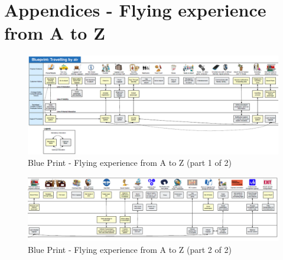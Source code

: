 \chapter{Appendices - Flying experience from A to Z}


\begin{figure}[h!]
	\centering
		\includegraphics[width=1.15\textwidth]{Figures/Appendix1/blueprint1}
		\caption[test meetings data]{Blue Print - Flying experience from A to Z (part 1 of 2)}
		\label{fig:blueprint1}
\end{figure}


\begin{figure}[h!]
	\centering
		\includegraphics[width=1.15\textwidth]{Figures/Appendix1/blueprint2}
	\caption[test meetings data]{Blue Print - Flying experience from A to Z (part 2 of 2)}
	\label{fig:blueprint2}
\end{figure}